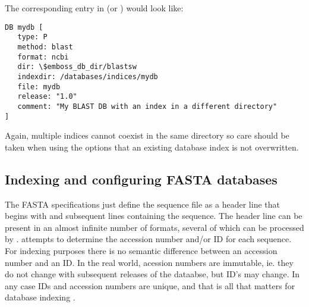 \documentclass{report}
\begin{document}
The corresponding entry in  (or
) would look like:


\begin{verbatim}
DB mydb [
   type: P
   method: blast
   format: ncbi
   dir: \$emboss_db_dir/blastsw
   indexdir: /databases/indices/mydb
   file: mydb
   release: "1.0"
   comment: "My BLAST DB with an index in a different directory"
]
\end{verbatim}

Again, multiple indices cannot coexist in the same directory so care
should be taken when using the  options that an
existing database index is not overwritten.

\begin{comment}
\subsubsection{FASTA formats used with \progname{dbiblast}}
\label{subsec:fasta}
The following FASTA formats are recognised by \progname{dbiblast}:

\begin{tabular}[t]{|l|l|}\hline \setlength{\baselineskip}{1.2\baselineskip}
GENBANK/NCBI & \ilcomm{> \ldots |accno|id \ldots }\\
\hline
GCG & \ilcomm{>{\sl dbname}:accno id \ldots }\\
\hline
SIMPLE &\ilcomm{ >accno id \ldots} \\
\hline
ID & \ilcomm{>id}\\
\hline
\end{tabular}
\ilcomm{...} refers to any text. Note that the ID must be the only
item in the header for the ID format.

\end{comment}
\subsection{Indexing and configuring FASTA databases}

The FASTA specifications just define the sequence file as a header
line that begins with \ilcomm{>} and subsequent lines containing the
sequence.  The header line can be present in an almost infinite number
of formats, several of which can be processed by \EMBOSS.  \EMBOSS
attempts to determine the accession number and/or ID for each
sequence.  For indexing purposes there is no semantic difference
between an accession number and an ID. In the real world, acession
numbers are immutable, ie. they do not change with subsequent releases
of the dataabse, but ID's may change. In any case IDs and accession
numbers are unique, and that is all that matters for database indexing
\EMBOSS.
\end{document}
